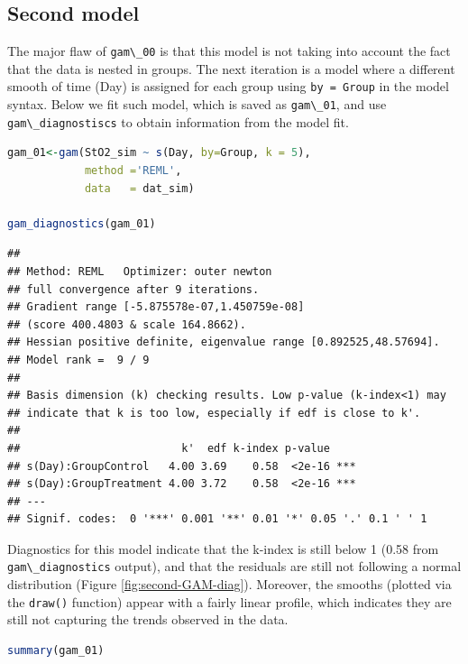\documentclass[
]{article}
\newcommand{\passthrough}[1]{#1}
\begin{document}
\hypertarget{second-model}{%
\subsection{Second model}\label{second-model}}

The major flaw of \passthrough{\lstinline!gam\_00!} is that this model is not taking into account the fact that the data is nested in groups. The next iteration is a model where a different smooth of time (Day) is assigned for each group using \passthrough{\lstinline!by = Group!} in the model syntax. Below we fit such model, which is saved as \passthrough{\lstinline!gam\_01!}, and use \passthrough{\lstinline!gam\_diagnostiscs!} to obtain information from the model fit.

\begin{lstlisting}[language=R]
gam_01<-gam(StO2_sim ~ s(Day, by=Group, k = 5),
            method ='REML',
            data   = dat_sim)

gam_diagnostics(gam_01)
\end{lstlisting}

\begin{lstlisting}
## 
## Method: REML   Optimizer: outer newton
## full convergence after 9 iterations.
## Gradient range [-5.875578e-07,1.450759e-08]
## (score 400.4803 & scale 164.8662).
## Hessian positive definite, eigenvalue range [0.892525,48.57694].
## Model rank =  9 / 9 
## 
## Basis dimension (k) checking results. Low p-value (k-index<1) may
## indicate that k is too low, especially if edf is close to k'.
## 
##                         k'  edf k-index p-value    
## s(Day):GroupControl   4.00 3.69    0.58  <2e-16 ***
## s(Day):GroupTreatment 4.00 3.72    0.58  <2e-16 ***
## ---
## Signif. codes:  0 '***' 0.001 '**' 0.01 '*' 0.05 '.' 0.1 ' ' 1
\end{lstlisting}

Diagnostics for this model indicate that the k-index is still below 1 (0.58 from \passthrough{\lstinline!gam\_diagnostics!} output), and that the residuals are still not following a normal distribution (Figure \ref{fig:second-GAM-diag}). Moreover, the smooths (plotted via the \passthrough{\lstinline!draw()!} function) appear with a fairly linear profile, which indicates they are still not capturing the trends observed in the data.

\begin{lstlisting}[language=R]
summary(gam_01)
\end{lstlisting}
\end{document}
